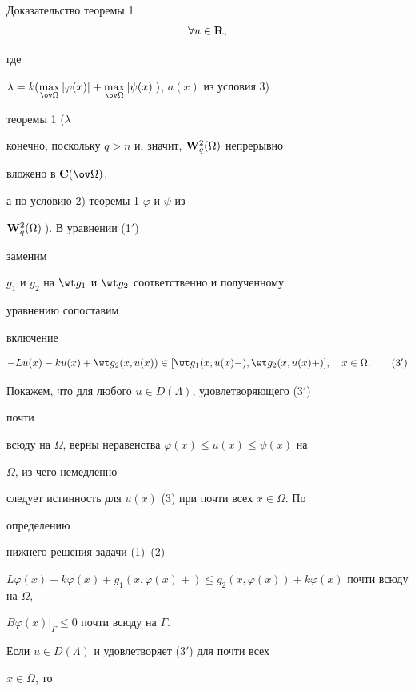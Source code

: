 \begin{pf*}{Доказательство теоремы 1}
\begin{equation}
\forall u\in\bold R, 


\end{equation} 


где 


$\lambda=k(\max\limits_{\ov\Omega}|\varphi(x)|+ 


\max\limits_{\ov\Omega}|\psi(x)|)$, $a(x)$ из условия 3) 


теоремы 1 ($\lambda$ 


конечно, поскольку $q>n$ и, значит, $\bold W^2_q(\Omega)$ непрерывно 


вложено в $\bold C(\ov\Omega)$, 


а по условию 2) теоремы 1\; $\varphi$ и $\psi$ из 


$\bold W^2_q(\Omega)$\,). В уравнении (1$'$) 


заменим 


$g_1$ и $g_2$ на $\wt g_1$ и $\wt g_2$ соответственно и полученному 


уравнению сопоставим 


включение 


\begin{equation} 


-Lu(x)-ku(x)+\wt g_2(x,u(x))\in 


[\wt g_1(x,u(x)-),\wt g_2(x,u(x)+)],\quad x\in\Omega.\tag{3$'$} 


\end{equation} 


 


Покажем, что для любого $u\in D(\Lambda)$, удовлетворяющего (3$'$) 


почти 


всюду на $\Omega$, верны неравенства $\varphi(x)\le u(x)\le\psi(x)$ на 


$\Omega$, из чего немедленно 


следует истинность для $u(x)$\; (3) при почти всех $x\in\Omega$. По 


определению 


нижнего решения задачи (1)--(2)\; 


$L\varphi(x)+k\varphi(x)+g_1(x,\varphi(x)+)\le 


g_2(x,\varphi(x))+k\varphi(x)$ почти всюду на $\Omega$, 


$B\varphi(x)|_\Gamma\le 0$ почти всюду на $\Gamma$. 


Если $u\in D(\Lambda)$ и удовлетворяет (3$'$) для почти всех 


$x\in\Omega$, то 



\end{pf*}
